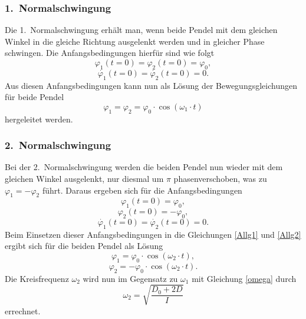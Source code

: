\subsubsection*{1.~Normalschwingung}
Die 1.~Normalschwingung erhält man, wenn beide Pendel mit dem gleichen Winkel in die gleiche Richtung ausgelenkt werden und in gleicher Phase schwingen. Die Anfangsbedingungen hierfür sind wie folgt
\begin{equation*}
    \varphi_1\left(t=0\right) = \varphi_2\left(t=0\right) = \varphi_0,
\end{equation*}
\begin{equation*}
    \dot{\varphi_1}\left(t=0\right) = \dot{\varphi_2}\left(t=0\right) = 0.
\end{equation*}
Aus diesen Anfangsbedingungen kann nun als Lösung der Bewegungsgleichungen für beide Pendel
\begin{equation}
    \varphi_1 = \varphi_2 = \varphi_0 \cdot \cos\left(\omega_1 \cdot t\right)
\end{equation}
hergeleitet werden.

\subsubsection*{2.~Normalschwingung}
Bei der 2.~Normalschwingung werden die beiden Pendel nun wieder mit dem gleichen Winkel ausgelenkt, nur diesmal um $\pi$ phasenverschoben, was zu $\varphi_1 = -\varphi_2$ führt. Daraus ergeben sich für die Anfangsbedingungen
\begin{equation*}
    \varphi_1\left(t=0\right) = \varphi_0,
\end{equation*}
\begin{equation*}
    \varphi_2\left(t=0\right) = -\varphi_0,
\end{equation*}
\begin{equation*}
    \dot{\varphi_1}\left(t=0\right) = \dot{\varphi_2}\left(t=0\right) = 0.
\end{equation*}
Beim Einsetzen dieser Anfangsbedingungen in die Gleichungen \ref{Allg1} und \ref{Allg2} ergibt sich für die beiden Pendel als Lösung
\begin{equation}
    \varphi_1 = \varphi_0 \cdot \cos\left(\omega_2 \cdot t\right),
\end{equation}
\begin{equation}
    \varphi_2 = - \varphi_0 \cdot \cos\left(\omega_2 \cdot t\right).
\end{equation}
Die Kreisfrequenz $\omega_2$ wird nun im Gegensatz zu $\omega_1$ mit Gleichung \ref{omega} durch
\begin{equation}
    \omega_2 = \sqrt{\frac{D_0 + 2D}{I}}
    \label{omega2}
\end{equation}
errechnet.

